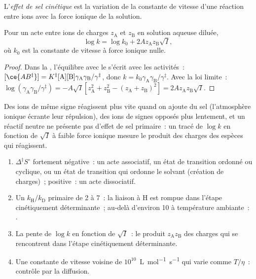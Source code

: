 \begin{definition}\label{def:b3:rate-theories:salt}
L'\emph{effet de sel cinétique} est la variation de la
constante de vitesse d'une réaction entre ions avec la force ionique de
la solution.
\end{definition}

\begin{proposition}\label{prop:b3:rate-theories:bronsted-bjerrum}
Pour un acte entre ions de charges $z_{\mathrm A}$ et $z_{\mathrm B}$ en
solution aqueuse diluée,
\[
  \log k = \log k_0 + 2Az_{\mathrm A}z_{\mathrm B}\sqrt I,
\]
où $k_0$ est la constante de vitesse à force ionique nulle.
\end{proposition}

\begin{proof}
Dans la , l'équilibre avec le  s'écrit avec les activités~:
$[\ce{AB^{\ddagger}}] = K^{\ddagger}[\mathrm A][\mathrm B]\gamma_{\mathrm A}\gamma_{\mathrm B}/\gamma^{\ddagger}$, donc $k = k_0\gamma_{\mathrm A}\gamma_{\mathrm B}/\gamma^{\ddagger}$.
Avec la loi limite~: $\log(\gamma_{\mathrm A}\gamma_{\mathrm B}/\gamma^{\ddagger}) = -A\sqrt I[z_{\mathrm A}^2 + z_{\mathrm B}^2 - (z_{\mathrm A} + z_{\mathrm B})^2] =
2Az_{\mathrm A}z_{\mathrm B}\sqrt I$.
\end{proof}

Des ions de même signe réagissent plus vite quand on ajoute du sel
(l'atmosphère ionique écrante leur répulsion), des ions de signes opposés
plus lentement, et un réactif neutre ne présente pas d'effet de sel
primaire~: un tracé de $\log k$ en fonction de $\sqrt I$ à faible
force ionique mesure le produit des charges des espèces qui réagissent.

\begin{method}\label{met:b3:rate-theories:mechanism-evidence}
\begin{enumerate}
  \item $\Delta^{\ddagger}S^\circ$ fortement négative~: un acte
        associatif, un état de transition ordonné ou cyclique, ou un état
        de transition qui ordonne le solvant (création de charges)~;
        positive~: un acte dissociatif.
  \item Un $k_{\mathrm H}/k_{\mathrm D}$ primaire de 2 à 7~: la liaison à
        H est rompue dans l'étape cinétiquement déterminante~; au-delà
        d'environ 10 à température ambiante~: .
  \item La pente de $\log k$ en fonction de $\sqrt I$~: le produit
        $z_{\mathrm A}z_{\mathrm B}$ des charges qui se rencontrent dans
        l'étape cinétiquement déterminante.
  \item Une constante de vitesse voisine de $10^{10}$~\unit{L.mol^{-1}.s^{-1}}
        qui varie comme $T/\eta$~:
        contrôle par la diffusion.
\end{enumerate}
\end{method}

